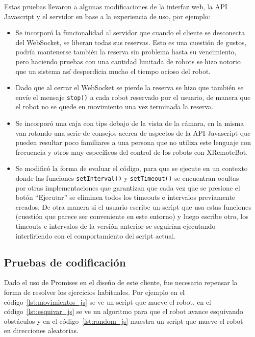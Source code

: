 Estas pruebas llevaron a algunas modificaciones de la interfaz
web, la API Javascript y el servidor en base a la experiencia de uso,
por ejemplo:
\begin{itemize}
    \item Se incorporó la funcionalidad al servidor que cuando
        el cliente se desconecta del WebSocket, se liberan todas
        sus reservas. Esto es una cuestión de gustos, podría
        mantenerse también la reserva sin problema hasta su
        vencimiento, pero haciendo pruebas con una cantidad
        limitada de robots se hizo notorio que un sistema
        así desperdicia mucho el tiempo ocioso del robot.
    \item Dado que al cerrar el WebSocket se pierde la reserva
        se hizo que también se envíe el mensaje \texttt{stop()}
        a cada robot reservado por el usuario, de manera
        que el robot no se quede en movimiento una vez
        terminada la reserva.
    \item Se incorporó una caja con tips debajo de la vista de
        la cámara, en la misma van rotando una serie de consejos
        acerca de aspectos de la API Javascript que pueden
        resultar poco familiares a una persona que no utiliza este
        lenguaje con frecuencia y otros muy específicos
        del control de los robots con XRemoteBot.
    \item Se modificó la forma de evaluar el código, para que se
        ejecute en un contexto donde las funciones
        \texttt{setInterval()} y \texttt{setTimeout()} se encuentran
        ocultas por otras implementaciones que garantizan que cada
        vez que se presione el botón ``Ejecutar'' se eliminen
        todos los timeouts e intervalos previamente creados.
        De otra manera si el usuario escribe un script que usa
        estas funciones
        (cuestión que parece ser conveniente en este entorno)
        y luego escribe otro, los timeouts e intervalos
        de la versión anterior se seguirían ejecutando
        interfiriendo con el comportamiento del script actual.
\end{itemize}

\subsection{Pruebas de codificación}

Dado el uso de Promises en el diseño de este cliente, fue
necesario repensar la forma
de resolver los ejercicios habituales. Por ejemplo en el
código~\ref{lst:movimientos_js} se ve un script que mueve el
robot, en el
código~\ref{lst:esquivar_js} se ve un algoritmo para que el robot
avance esquivando obstáculos y en el código~\ref{lst:random_js}
muestra un script que mueve el robot en direcciones aleatorias.

